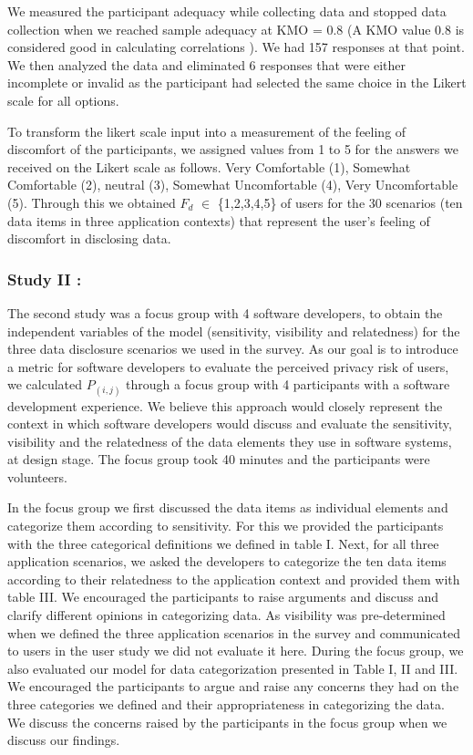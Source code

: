 \documentclass[10pt]{article}
\begin{document}
We measured the participant adequacy while collecting data and stopped data collection when we reached sample adequacy at KMO = 0.8 (A KMO value $0.8$ is considered good in calculating correlations \cite {kim1978factor}). We had 157 responses at that point. We then analyzed the data and eliminated 6 responses that were either incomplete or invalid as the participant had selected the same choice in the Likert scale for all options.

To transform the likert scale input into a measurement of the feeling of discomfort of the participants, we assigned values from 1 to 5 for the answers we received on the Likert scale as follows. Very Comfortable (1), Somewhat Comfortable (2), neutral (3), Somewhat Uncomfortable (4), Very Uncomfortable (5). Through this we obtained $F_d$ $\in$ \{1,2,3,4,5\} of users for the 30 scenarios (ten data items in three application contexts) that represent the user's feeling of discomfort in disclosing data.

\subsubsection{Study II : }

The second study was a focus group with 4 software developers, to obtain the independent variables of the model (sensitivity, visibility and relatedness) for the three data disclosure scenarios we used in the survey. As our goal is to introduce a metric for software developers to evaluate the perceived privacy risk of users, we calculated $P_{(i,j)}$ through a focus group with 4 participants with a software development experience. We believe this approach would closely represent the context in which software developers would discuss and evaluate the sensitivity, visibility and the relatedness of the data elements they use in software systems, at design stage. The focus group took 40 minutes and the participants were volunteers.

In the focus group we first discussed the data items as individual elements and categorize them according to sensitivity. For this we provided the participants with the three categorical definitions we defined in table I. Next, for all three application scenarios, we asked the developers to categorize the ten data items according to their relatedness to the application context and provided them with table III. We encouraged the participants to raise arguments and discuss and clarify different opinions in categorizing data. As visibility was pre-determined when we defined the three application scenarios in the survey and communicated to users in the user study we did not evaluate it here. During the focus group, we also evaluated our model for data categorization presented in  Table I, II and III. We encouraged the participants to argue and raise any concerns they had on the three categories we defined and their appropriateness in categorizing the data. We discuss the concerns raised by the participants in the focus group when we discuss our findings. 
\end{document}
